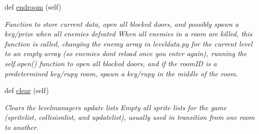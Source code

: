 \begin{DoxyCompactItemize}
def \hyperlink{classcollision_1_1levelmanager_1_1_level_manager_ab31d4ea306a0ef50bf25a4a4dd3b9aaf}{endroom} (self)
\begin{DoxyCompactList}\small\item\em Function to store current data, open all blocked doors, and possibly spawn a key/prize when all enemies defeated  When all enemies in a room are killed, this function is called, changing the enemy array in leveldata.\+py for the current level to an empty array (so enemies don\textquotesingle{}t reload once you enter again), running the self.\+open() function to open all blocked doors, and if the room\+ID is a predetermined key/rupy room, spawn a key/rupy in the middle of the room. \end{DoxyCompactList}\item 
\mbox{\label{classcollision_1_1levelmanager_1_1_level_manager_a11bb309e2c9c137a0000f1d94b3788f6}} 
def \hyperlink{classcollision_1_1levelmanager_1_1_level_manager_a11bb309e2c9c137a0000f1d94b3788f6}{clear} (self)
\begin{DoxyCompactList}\small\item\em Clears the levelmanager\textquotesingle{}s update lists  Empty all sprite lists for the game (spritelist, collisionlist, and updatelist), usually used in transition from one room to another. \end{DoxyCompactList}\end{DoxyCompactItemize}
